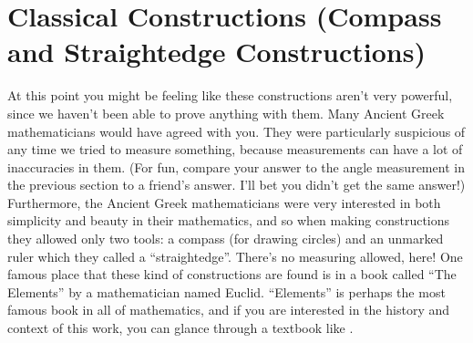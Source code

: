 \documentclass{ximera}
\begin{document}
\section{Classical Constructions (Compass and Straightedge Constructions)}

At this point you might be feeling like these constructions aren't very powerful, since we haven't been able to prove anything with them. Many Ancient Greek mathematicians would have agreed with you. They were particularly suspicious of any time we tried to measure something, because measurements can have a lot of inaccuracies in them. (For fun, compare your answer to the angle measurement in the previous section to a friend's answer. I'll bet you didn't get the same answer!) Furthermore, the Ancient Greek mathematicians were very interested in both simplicity and beauty in their mathematics, and so when making constructions they allowed only two tools: a compass (for drawing circles) and an unmarked ruler which they called a ``straightedge''. There's no measuring allowed, here! One famous place that these kind of constructions are  found is in a book called ``The Elements'' by a mathematician named Euclid. ``Elements'' is perhaps the most famous book in all of mathematics, and if you are interested in the history and context of this work, you can glance through a textbook like . 
\end{document}
